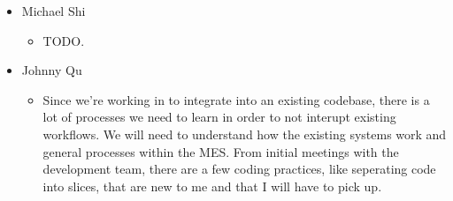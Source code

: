 \documentclass[12pt]{article}
\begin{document}
\begin{enumerate}
\begin{itemize}
    \item Michael Shi
      \begin{itemize}[label=$\circ$]
        \item TODO.
      \end{itemize}
    \item Johnny Qu
      \begin{itemize}[label=$\circ$]
        \item Since we're working in to integrate into an existing codebase, there is a lot of processes we need to learn in order to not interupt existing workflows. We will need to understand how the existing systems work and general processes within the MES. From initial meetings with the development team, there are a few coding practices, like seperating code into slices, that are new to me and that I will have to pick up.
      \end{itemize}
  \end{itemize}


\end{enumerate}
\end{document}
